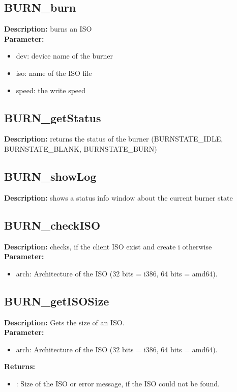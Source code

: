 \subsection{BURN\_burn}
\textbf{Description:} burns an ISO\\
\textbf{Parameter:}
\begin{itemize}
\item dev: device name of the burner
\item iso: name of the ISO file
\item speed: the write speed
\end{itemize}

\subsection{BURN\_getStatus}
\textbf{Description:} returns the status of the burner (BURNSTATE\_IDLE, BURNSTATE\_BLANK, BURNSTATE\_BURN)\\

\subsection{BURN\_showLog}
\textbf{Description:} shows a status info window about the current burner state\\

\subsection{BURN\_checkISO}
\textbf{Description:} checks, if the client ISO exist and create i otherwise\\
\textbf{Parameter:}
\begin{itemize}
\item arch: Architecture of the ISO (32 bits = i386, 64 bits = amd64).
\end{itemize}

\subsection{BURN\_getISOSize}
\textbf{Description:} Gets the size of an ISO.\\
\textbf{Parameter:}
\begin{itemize}
\item arch: Architecture of the ISO (32 bits = i386, 64 bits = amd64).
\end{itemize}
\textbf{Returns:}
\begin{itemize}
\item : Size of the ISO or error message, if the ISO could not be found.
\end{itemize}

